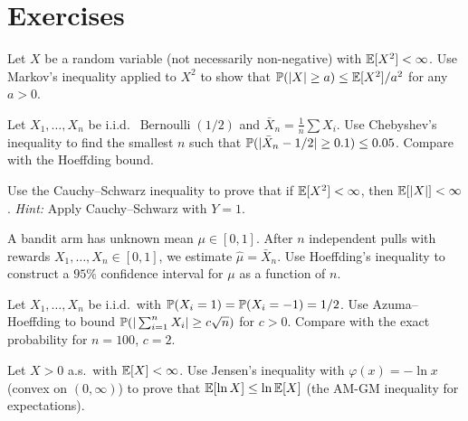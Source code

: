 \documentclass[11pt,a4paper]{article}
\begin{document}

\section{Exercises}
\label{sec:exercises}

\begin{exercise}
\label{ex:markov_nonneg}
Let $X$ be a random variable (not necessarily non-negative) with
$\mathbb{E}[X^2] < \infty$.  Use Markov's inequality applied to $X^2$ to
show that $\mathbb{P}(|X| \geq a) \leq \mathbb{E}[X^2]/a^2$ for any $a > 0$.
\end{exercise}

\begin{exercise}
\label{ex:chebyshev_bernoulli}
Let $X_1, \ldots, X_n$ be i.i.d.\
$\operatorname{Bernoulli}(1/2)$ and
$\bar{X}_n = \frac{1}{n}\sum X_i$.  Use Chebyshev's inequality
to find the smallest $n$ such that
$\mathbb{P}(|\bar{X}_n - 1/2| \geq 0.1) \leq 0.05$.  Compare with
the Hoeffding bound.
\end{exercise}

\begin{exercise}
\label{ex:cs_l2}
Use the Cauchy--Schwarz inequality to prove that if
$\mathbb{E}[X^2] < \infty$, then $\mathbb{E}[|X|] < \infty$.
\textit{Hint:} Apply Cauchy--Schwarz with $Y = 1$.
\end{exercise}

\begin{exercise}
\label{ex:hoeffding_confidence}
A bandit arm has unknown mean $\mu \in [0,1]$.  After $n$
independent pulls with rewards $X_1, \ldots, X_n \in [0,1]$,
we estimate $\hat{\mu} = \bar{X}_n$.  Use Hoeffding's inequality
to construct a $95\%$ confidence interval for $\mu$ as a
function of $n$.
\end{exercise}

\begin{exercise}
\label{ex:azuma_random_walk}
Let $X_1, \ldots, X_n$ be i.i.d.\ with
$\mathbb{P}(X_i = 1) = \mathbb{P}(X_i = -1) = 1/2$.
Use Azuma--Hoeffding to bound
$\mathbb{P}(|\sum_{i=1}^n X_i| \geq c\sqrt{n})$ for $c > 0$.
Compare with the exact probability for $n = 100$, $c = 2$.
\end{exercise}

\begin{exercise}
\label{ex:jensen_log}
Let $X > 0$ a.s.\ with $\mathbb{E}[X] < \infty$.  Use Jensen's
inequality with $\varphi(x) = -\ln x$ (convex on $(0,\infty)$)
to prove that $\mathbb{E}[\ln X] \leq \ln \mathbb{E}[X]$ (the AM-GM inequality
for expectations).
\end{exercise}
\end{document}

